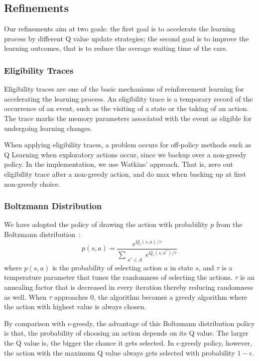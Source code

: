 \subsection{Refinements}
Our refinements aim at two goals: the first goal is to accelerate the learning
process by different Q value update strategies; the second goal is to improve
the learning outcomes, that is to reduce the average waiting time of the cars.

\subsubsection{Eligibility Traces}
Eligibility traces are one of the basic mechanisms of reinforcement learning for
accelerating the learning process. An eligibility trace is a temporary record of
the occurrence of an event, such as the visiting of a state or the taking of an
action. The trace marks the memory parameters associated with the event as
eligible for undergoing learning changes.

When applying eligibility traces, a problem occurs for off-policy methods such
as Q Learning when exploratory actions occur, since we backup over a non-greedy
policy. In the implementation, we use Watkins' approach. That is, zero out
eligibility trace after a non-greedy action, and do max when backing up at first
non-greedy choice.

\subsubsection{Boltzmann Distribution}
We have adopted the policy of drawing the action with probability $p$ from the
Boltzmann distribution~\cite{watkins_qlearning_1992}:
\begin{equation}
\label{equ:rewardprob}
p(s, a) = \dfrac {e^{Q_t(s, a) / \tau}} {\sum_{\substack{a^* \in A}} e^{Q_t(s, a^*) / \tau}}
\end{equation}
where $p(s, a)$ is the probability of selecting action $a$ in state $s$, and $\tau$ is a temperature parameter that tunes the randomness of selecting the actions. $\tau$ is an annealing factor that is decreased in every iteration thereby reducing randomness as well. When $\tau$ approaches 0, the algorithm becomes a greedy algorithm where the action with highest value is always chosen.

By comparison with $\epsilon $-greedy, the advantage of this Boltzmann
distribution policy is that, the probability of choosing an action depends on
its Q value. The larger the Q value is, the bigger the chance it gets selected.
In $\epsilon $-greedy policy, however, the action with the maximum Q value
always gets selected with probability $1-\epsilon$.

